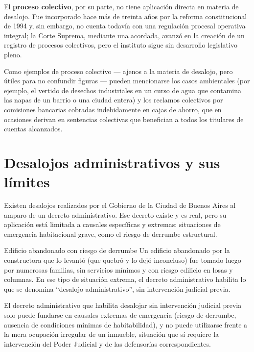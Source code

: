 \documentclass[12pt,oneside]{book}
\begin{document}
El \textbf{proceso colectivo}, por su parte, no tiene aplicación directa en materia de desalojo. Fue incorporado hace más de treinta años por la reforma constitucional de 1994 y, sin embargo, no cuenta todavía con una regulación procesal operativa integral; la Corte Suprema, mediante una acordada, avanzó en la creación de un registro de procesos colectivos, pero el instituto sigue sin desarrollo legislativo pleno.

\begin{note}
Como ejemplos de proceso colectivo --- ajenos a la materia de desalojo, pero útiles para no confundir figuras --- pueden mencionarse los casos ambientales (por ejemplo, el vertido de desechos industriales en un curso de agua que contamina las napas de un barrio o una ciudad entera) y los reclamos colectivos por comisiones bancarias cobradas indebidamente en cajas de ahorro, que en ocasiones derivan en sentencias colectivas que benefician a todos los titulares de cuentas alcanzados.
\end{note}

\section{Desalojos administrativos y sus límites}

Existen desalojos realizados por el Gobierno de la Ciudad de Buenos Aires al amparo de un decreto administrativo. Ese decreto existe y es real, pero su aplicación está limitada a causales específicas y extremas: situaciones de emergencia habitacional grave, como el riesgo de derrumbe estructural.

\begin{example}{Edificio abandonado con riesgo de derrumbe}
Un edificio abandonado por la constructora que lo levantó (que quebró y lo dejó inconcluso) fue tomado luego por numerosas familias, sin servicios mínimos y con riesgo edilicio en losas y columnas. En ese tipo de situación extrema, el decreto administrativo habilita lo que se denomina ``desalojo administrativo'', sin intervención judicial previa.
\end{example}

\begin{important}
El decreto administrativo que habilita desalojar sin intervención judicial previa solo puede fundarse en causales extremas de emergencia (riesgo de derrumbe, ausencia de condiciones mínimas de habitabilidad), y no puede utilizarse frente a la mera ocupación irregular de un inmueble, situación que sí requiere la intervención del Poder Judicial y de las defensorías correspondientes.
\end{important}
\end{document}
